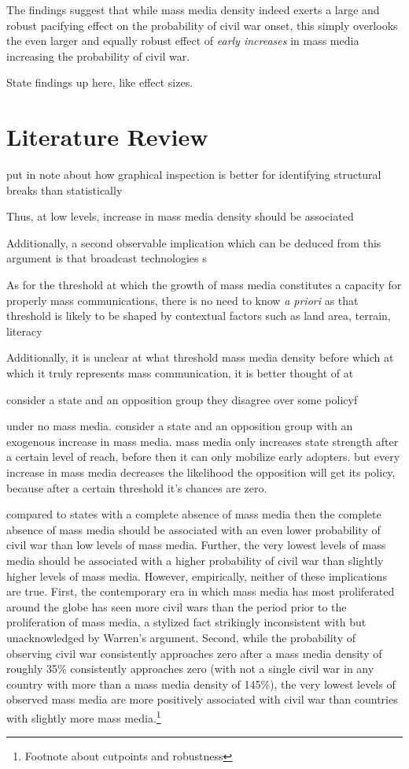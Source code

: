 \documentclass[11pt,article,oneside]{memoir}
\begin{document}
The findings suggest that while mass media density indeed exerts a large
and robust pacifying effect on the probability of civil war onset, this
simply overlooks the even larger and equally robust effect of
\emph{early increases} in mass media increasing the probability of civil
war.

State findings up here, like effect sizes.

\section{Literature Review}\label{literature-review}

put in note about how graphical inspection is better for identifying
structural breaks than statistically

Thus, at low levels, increase in mass media density should be associated

Additionally, a second observable implication which can be deduced from
this argument is that broadcast technologies s

As for the threshold at which the growth of mass media constitutes a
capacity for properly mass communications, there is no need to know
\emph{a priori} as that threshold is likely to be shaped by contextual
factors such as land area, terrain, literacy

Additionally, it is unclear at what threshold mass media density before
which at which it truly represents mass communication, it is better
thought of at

consider a state and an opposition group they disagree over some policyf

under no mass media. consider a state and an opposition group with an
exogenous increase in mass media. mass media only increases state
strength after a certain level of reach, before then it can only
mobilize early adopters. but every increase in mass media decreases the
likelihood the opposition will get its policy, because after a certain
threshold it's chances are zero.

compared to states with a complete absence of mass media then the
complete absence of mass media should be associated with an even lower
probability of civil war than low levels of mass media. Further, the
very lowest levels of mass media should be associated with a higher
probability of civil war than slightly higher levels of mass media.
However, empirically, neither of these implications are true. First, the
contemporary era in which mass media has most proliferated around the
globe has seen more civil wars than the period prior to the
proliferation of mass media, a stylized fact strikingly inconsistent
with but unacknowledged by Warren's argument. Second, while the
probability of observing civil war consistently approaches zero after a
mass media density of roughly 35\% consistently approaches zero (with
not a single civil war in any country with more than a mass media
density of 145\%), the very lowest levels of observed mass media are
more positively associated with civil war than countries with slightly
more mass media.\footnote{Footnote about cutpoints and robustness}
\end{document}
